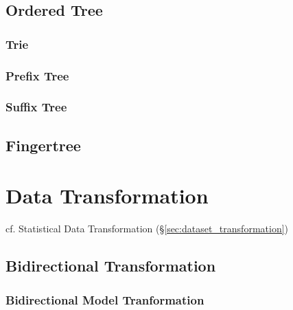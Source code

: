 \subsection{Ordered Tree}\label{sec:ordered_tree}

\subsubsection{Trie}\label{sec:trie}

\subsubsection{Prefix Tree}\label{sec:prefix_tree}

\subsubsection{Suffix Tree}\label{sec:suffix_tree}



\subsection{Fingertree}\label{sec:fingertree}



\section{Data Transformation}\label{sec:data_transformation}

\fist cf. Statistical Data Transformation (\S\ref{sec:dataset_transformation})



\subsection{Bidirectional Transformation}
\label{sec:bidirectional_transformation}

\subsubsection{Bidirectional Model Tranformation}
\label{sec:bidirectional_model_transformation}


